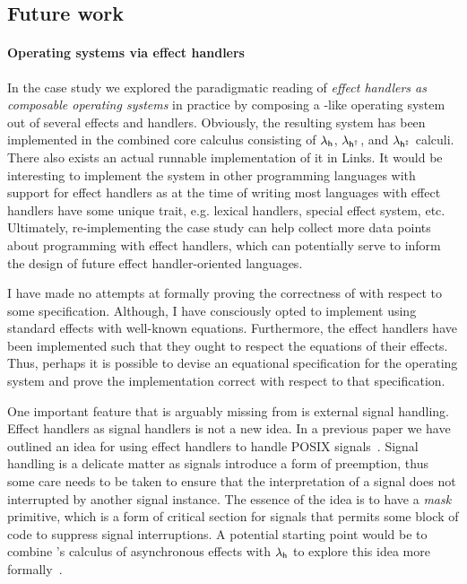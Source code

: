 \documentclass[12pt,phd,lfcs,twoside,openright,logo,leftchapter,normalheadings]{infthesis}
\theoremstyle{plain}
\theoremstyle{definition}
\begin{document}
\subsection{Future work}

\paragraph{Operating systems via effect handlers}
In the \UNIX{} case study we explored the paradigmatic reading of
\emph{effect handlers as composable operating systems} in practice by
composing a \UNIX{}-like operating system out of several effects and
handlers. Obviously, the resulting system \OSname{} has been
implemented in the combined core calculus consisting of $\lambda_{\mathsf{h}}$,
$\lambda_{\mathsf{h^\dagger}}$, and $\lambda_{\mathsf{h^{\ddagger}}}$ calculi. There also exists an actual runnable
implementation of it in Links. It would be interesting to implement
the system in other programming languages with support for effect
handlers as at the time of writing most languages with effect handlers
have some unique trait, e.g. lexical handlers, special effect system,
etc. Ultimately, re-implementing the case study can help collect more
data points about programming with effect handlers, which can
potentially serve to inform the design of future effect
handler-oriented languages.

I have made no attempts at formally proving the correctness of
\OSname{} with respect to some specification. Although, I have
consciously opted to implement \OSname{} using standard effects with
well-known equations. Furthermore, the effect handlers have been
implemented such that they ought to respect the equations of their
effects. Thus, perhaps it is possible to devise an equational
specification for the operating system and prove the implementation
correct with respect to that specification.

One important feature that is arguably missing from \OSname{} is
external signal handling. Effect handlers as signal handlers is not a
new idea. In a previous paper we have outlined an idea for using
effect handlers to handle POSIX signals~\cite{DolanEHMSW17}. Signal
handling is a delicate matter as signals introduce a form of
preemption, thus some care needs to be taken to ensure that the
interpretation of a signal does not interrupted by another signal
instance. The essence of the idea is to have a \emph{mask} primitive,
which is a form of critical section for signals that permits some
block of code to suppress signal interruptions. A potential starting
point would be to combine \citeauthor{AhmanP21}'s calculus of
asynchronous effects with $\lambda_{\mathsf{h}}$ to explore this idea more
formally~\cite{AhmanP21}.
\end{document}

